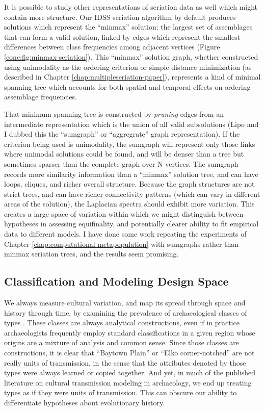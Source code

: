It is possible to study other representations of seriation data as well which might contain more structure.  Our IDSS seriation algorithm \citep{Lipo2015} by default produces solutions which represent the ``minmax'' solution:  the largest set of assemblages that can form a valid solution, linked by edges which represent the smallest differences between class frequencies among adjacent vertices (Figure \ref{conc:fig:minmax-seriation}).  This ``minmax'' solution graph, whether constructed using unimodality as the ordering criterion or simple distance minimization (as described in Chapter \ref{chap:multipleseriation-paper}), represents a kind of minimal spanning tree which accounts for both spatial and temporal effects on ordering assemblage frequencies.  

That minimum spanning tree is constructed by \emph{pruning} edges from an intermediate representation which is the union of all valid subsolutions (Lipo and I dubbed this the ``sumgraph'' or ``aggregrate'' graph representation).  If the criterion being used is unimodality, the sumgraph will represent only those links where unimodal solutions could be found, and will be denser than a tree but sometimes sparser than the complete graph over N vertices.  The sumgraph records more similarity information than a ``minmax'' solution tree, and can have loops, cliques, and richer overall structure.  Because the graph structures are not strict trees, and can have richer connectivity patterns (which can vary in different areas of the solution), the Laplacian spectra should exhibit more variation.  This creates a large space of variation within which we might distinguish between hypotheses in assessing equifinality, and potentially clearer ability to fit empirical data to different models.  I have done some work repeating the experiments of Chapter \ref{chap:computational-metapopulation} with sumgraphs rather than minmax seriation trees, and the results seem promising.  

\subsection{Classification and Modeling Design Space}\label{conc:sec:future-design-space}

We always measure cultural variation, and map its spread through space and history through time, by examining the prevalence of archaeological classes of types \citep{Dunnell1971}.  These classes are always analytical constructions, even if in practice archaeologists frequently employ standard classifications in a given region whose origins are a mixture of analysis and common sense.  Since those classes are constructions, it is clear that ``Baytown Plain'' or ``Elko corner-notched'' are not really units of transmission, in the sense that the attributes denoted by those types were always learned or copied together.  And yet, in much of the published literature on cultural transmission modeling in archaeology, we end up treating types as if they were units of transmission.  This can obscure our ability to differentiate hypotheses about evolutionary history.  



